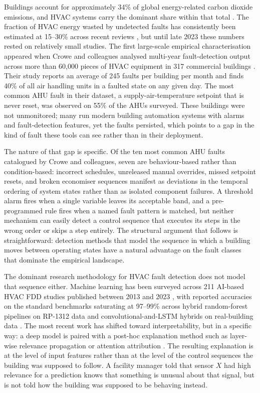 \documentclass[11pt,letterpaper]{article}
\begin{document}
Buildings account for approximately 34\% of global energy-related carbon dioxide emissions, and HVAC systems carry the dominant share within that total \cite{bi2024aihvacreview}. The fraction of HVAC energy wasted by undetected faults has consistently been estimated at 15--30\% across recent reviews \cite{bi2024aihvacreview,pritoni2022faultcorrection}, but until late 2023 these numbers rested on relatively small studies. The first large-scale empirical characterisation appeared when Crowe and colleagues analysed multi-year fault-detection output across more than 60{,}000 pieces of HVAC equipment in 317 commercial buildings \cite{crowe2023faultprevalence}. Their study reports an average of 245 faults per building per month and finds 40\% of all air handling units in a faulted state on any given day. The most common AHU fault in their dataset, a supply-air-temperature setpoint that is never reset, was observed on 55\% of the AHUs surveyed. These buildings were not unmonitored; many run modern building automation systems with alarms and fault-detection features, yet the faults persisted, which points to a gap in the kind of fault these tools can see rather than in their deployment.

The nature of that gap is specific. Of the ten most common AHU faults catalogued by Crowe and colleagues, seven are behaviour-based rather than condition-based: incorrect schedules, unreleased manual overrides, missed setpoint resets, and broken economiser sequences manifest as deviations in the temporal ordering of system states rather than as isolated component failures. A threshold alarm fires when a single variable leaves its acceptable band, and a pre-programmed rule fires when a named fault pattern is matched, but neither mechanism can easily detect a control sequence that executes its steps in the wrong order or skips a step entirely. The structural argument that follows is straightforward: detection methods that model the sequence in which a building moves between operating states have a natural advantage on the fault classes that dominate the empirical landscape.

The dominant research methodology for HVAC fault detection does not model that sequence either. Machine learning has been surveyed across 211 AI-based HVAC FDD studies published between 2013 and 2023 \cite{bi2024aihvacreview}, with reported accuracies on the standard benchmarks saturating at 97--99\% across hybrid random-forest pipelines on RP-1312 data \cite{tun2021hybridrfsvm} and convolutional-and-LSTM hybrids on real-building data \cite{prince2025improved1dcnnlstm}. The most recent work has shifted toward interpretability, but in a specific way: a deep model is paired with a post-hoc explanation method such as layer-wise relevance propagation or attention attribution \cite{deng2024afgcn,wang2025xmhac}. The resulting explanation is at the level of input features rather than at the level of the control sequences the building was supposed to follow. A facility manager told that sensor $X$ had high relevance for a prediction knows that something is unusual about that signal, but is not told how the building was supposed to be behaving instead.
\end{document}
